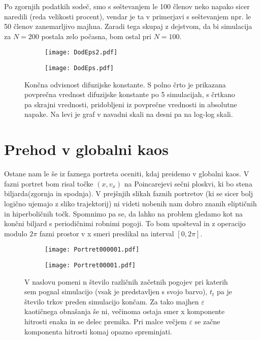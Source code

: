 \documentclass{article}
\begin{document}
Po zgornjih podatkih sodeč, smo s seštevanjem le 100 členov neko napako sicer naredili (reda velikosti procent), vendar je ta v primerjavi s seštevanjem npr. le 50 členov zanemarljivo majhna. Zaradi tega skupaj z dejstvom, da bi simulacija za $N=200$ postala zelo počasna, bom ostal pri $N=100$.  

\begin{figure}[H]
\centering
\begin{subfigure}{.49\textwidth}
\texttt{[image: DodEps2.pdf]}
\end{subfigure}
\begin{subfigure}{.49\textwidth}
\texttt{[image: DodEps.pdf]}
\end{subfigure}
\caption*{Končna odvisnost difuzijske konstante. S polno črto je prikazana povprečna vrednost difuzijske konstante po 5 simulacijah, s črtkano pa skrajni vrednosti, pridobljeni iz povprečne vrednosti in absolutne napake. Na levi je graf v navadni skali na desni pa na log-log skali.}
\end{figure}

\section{Prehod v globalni kaos}

Ostane nam le še iz faznega portreta oceniti, kdaj preidemo v globalni kaos. V fazni portret bom risal točke $(x,v_x)$ na Poincarejevi sečni ploskvi, ki bo stena biljarda(zgornja in spodnja). V prejšnjih slikah faznih portretov (ki se sicer bolj logično ujemajo z sliko trajektorij) ni videti nobenih nam dobro znanih eliptičnih in hiperboličnih točk. Spomnimo pa se, da lahko na problem gledamo kot na končni biljard s periodičnimi robnimi pogoji. To bom upošteval in z operacijo modulo $2 \pi$ fazni prostor v x smeri preslikal na interval $[0,2 \pi]$.

\begin{figure}[H]
\centering
\begin{subfigure}{.49\textwidth}
\texttt{[image: Portret000001.pdf]}
\end{subfigure}
\begin{subfigure}{.49\textwidth}
\texttt{[image: Portret00001.pdf]}
\end{subfigure}
\caption*{V naslovu pomeni n število različnih začetnih pogojev pri katerih sem pognal simulacijo (vsak je predstavljen s svojo barvo), $t_t$ pa je število trkov preden simulacijo končam. Za tako majhen $\varepsilon$ kaotičnega obnašanja še ni, večinoma ostaja smer x komponente hitrosti enaka in se delec premika. Pri malce večjem $\varepsilon$ se začne komponenta hitrosti komaj opazno spreminjati.}
\end{figure}
\end{document}
